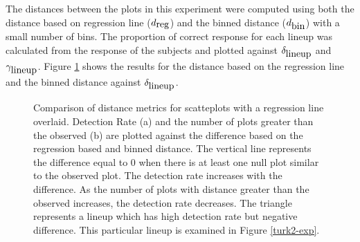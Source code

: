 \documentclass[12]{article}
\begin{document}
The distances between the plots in this experiment were computed using both the distance based on regression line ($d_{\hbox{reg}}$) and the binned distance ($d_{\hbox{bin}}$) with a small number of bins. The proportion of correct response for each lineup was calculated from the response of the subjects and plotted against $\delta_{\hbox{lineup}}$ and $\gamma_{\hbox{lineup}}$.  Figure \ref{turk2comp} shows the results for the distance based on the regression line and the binned distance against $\delta_{\hbox{lineup}}$.


\begin{figure}[hbtp]
\centering
{}
	\vspace{-.1in}
\caption[Optional caption for list of figures]{Comparison of distance metrics for scatteplots with a regression line overlaid. Detection Rate (a) and the number of plots greater than the observed (b) are plotted against the difference based on the regression based and binned distance. The vertical line represents the difference equal to 0 when there is at least one null plot similar to the observed plot. The detection rate increases with the difference. As the number of plots with distance greater than the observed increases, the detection rate decreases.  The triangle represents a lineup which has high detection rate but negative difference. This particular lineup is examined in Figure \ref{turk2-exp}.}
\label{turk2comp}
\end{figure}
\end{document}
